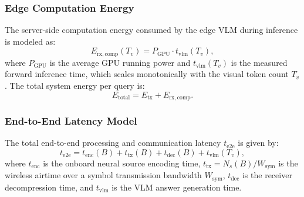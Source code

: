 \subsubsection{Edge Computation Energy}
The server-side computation energy consumed by the edge VLM during inference is modeled as:
\begin{equation}
E_{\mathrm{rx,comp}}(T_v) = P_{\mathrm{GPU}} \cdot t_{\mathrm{vlm}}(T_v),
\end{equation}
where $P_{\mathrm{GPU}}$ is the average GPU running power and $t_{\mathrm{vlm}}(T_v)$ is the measured forward inference time, which scales monotonically with the visual token count $T_v$. The total system energy per query is:
\begin{equation}
E_{\mathrm{total}} = E_{\mathrm{tx}} + E_{\mathrm{rx,comp}}.
\end{equation}

\subsubsection{End-to-End Latency Model}
The total end-to-end processing and communication latency $t_{\mathrm{e2e}}$ is given by:
\begin{equation}\label{eq:latency}
t_{\mathrm{e2e}} = t_{\mathrm{enc}}(B) + t_{\mathrm{tx}}(B) + t_{\mathrm{dec}}(B) + t_{\mathrm{vlm}}(T_v),
\end{equation}
where $t_{\mathrm{enc}}$ is the onboard neural source encoding time, $t_{\mathrm{tx}} = N_s(B) / W_{\mathrm{sym}}$ is the wireless airtime over a symbol transmission bandwidth $W_{\mathrm{sym}}$, $t_{\mathrm{dec}}$ is the receiver decompression time, and $t_{\mathrm{vlm}}$ is the VLM answer generation time.

